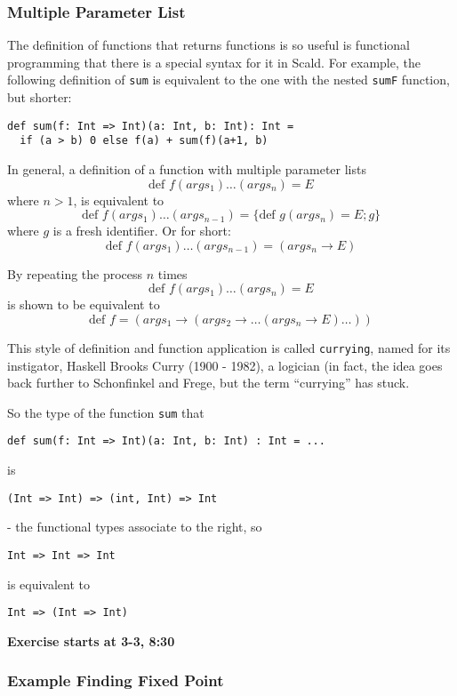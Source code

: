 \documentclass{scrartcl}
\newcommand{\term}[1]{\verb~#1~} %
\begin{document}
\subsubsection{Multiple Parameter List}
\label{sec:MultipleParameterList}

The definition of functions that returns functions is so useful is functional
programming that there is a special syntax for it in Scald. For example, the
following definition of \lstinline|sum| is equivalent to the one with the nested
\lstinline|sumF| function, but shorter:
\begin{lstlisting}
def sum(f: Int => Int)(a: Int, b: Int): Int = 
  if (a > b) 0 else f(a) + sum(f)(a+1, b)
\end{lstlisting}

In general, a definition of a function with multiple parameter lists
$$\text{def }f(args_1)\dots(args_n) = E$$
where $n > 1$, is equivalent to
$$\text{def }f(args_1)\dots(args_{n-1}) = \{\text{def } g(args_n) = E; g\}$$
where $g$ is a fresh identifier. Or for short:
$$\text{def } f(args_1)\dots(args_{n-1}) = (args_n \to E)$$

By repeating the process $n$ times
$$\text{def } f(args_1)\dots(args_n) = E$$
is shown to be equivalent to
$$\text{def } f = (args_1 \to (args_2 \to \dots(args_n \to E) \dots )) $$

This style of definition and function application is called \term{currying},
named for its instigator, Haskell Brooks Curry (1900 - 1982), a logician (in
fact, the idea goes back further to Schonfinkel and Frege, but the term
``currying'' has stuck.

So the type of the function \lstinline|sum| that
\begin{lstlisting}
def sum(f: Int => Int)(a: Int, b: Int) : Int = ...
\end{lstlisting}
is
\begin{lstlisting}
(Int => Int) => (int, Int) => Int
\end{lstlisting}
- the functional types associate to the right, so
\begin{lstlisting}
Int => Int => Int
\end{lstlisting}
is equivalent to
\begin{lstlisting}
Int => (Int => Int)
\end{lstlisting}
{\bf Exercise starts at 3-3, 8:30 }

\subsubsection{Example Finding Fixed Point}
\label{sec:ExampleFindingFixedPoint}
\end{document}
